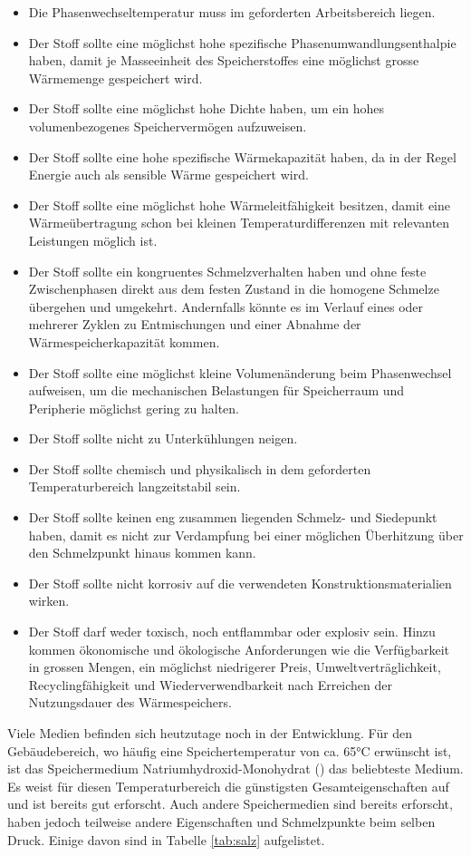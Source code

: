 \documentclass[11pt,a4paper]{scrartcl}
\begin{document}
\begin{itemize}
  \item Die Phasenwechseltemperatur muss im geforderten Arbeitsbereich liegen.
 \item Der Stoff sollte eine möglichst hohe spezifische
  Phasenumwandlungsenthalpie haben, damit je Masseeinheit des Speicherstoffes eine möglichst grosse
Wärmemenge gespeichert wird.
\item Der Stoff sollte eine möglichst hohe Dichte haben, um ein hohes
volumenbezogenes Speichervermögen aufzuweisen.
\item Der Stoff sollte eine hohe spezifische Wärmekapazität haben, da in der Regel
Energie auch als sensible Wärme gespeichert wird.
\item Der Stoff sollte eine möglichst hohe Wärmeleitfähigkeit besitzen, damit eine
Wärmeübertragung schon bei kleinen Temperaturdifferenzen mit relevanten
Leistungen möglich ist.
\item Der Stoff sollte ein kongruentes Schmelzverhalten haben und ohne feste
Zwischenphasen direkt aus dem festen Zustand in die homogene Schmelze übergehen
und umgekehrt. Andernfalls könnte es im Verlauf eines oder mehrerer Zyklen zu
Entmischungen und einer Abnahme der Wärmespeicherkapazität kommen.
\item Der Stoff sollte eine möglichst kleine Volumenänderung beim Phasenwechsel
aufweisen, um die mechanischen Belastungen für Speicherraum und Peripherie
möglichst gering zu halten.
\item Der Stoff sollte nicht zu Unterkühlungen neigen.
\item Der Stoff sollte chemisch und physikalisch in dem geforderten
Temperaturbereich langzeitstabil sein.
\item Der Stoff sollte keinen eng zusammen liegenden Schmelz- und Siedepunkt haben,
damit es nicht zur Verdampfung bei einer möglichen Überhitzung über den
Schmelzpunkt hinaus kommen kann.
\item Der Stoff sollte nicht korrosiv auf die verwendeten Konstruktionsmaterialien
wirken.
\item  Der Stoff darf weder toxisch, noch entflammbar oder explosiv sein. Hinzu
kommen ökonomische und ökologische Anforderungen wie die Verfügbarkeit in
grossen Mengen, ein möglichst niedrigerer Preis, Umweltverträglichkeit,
Recyclingfähigkeit und Wiederverwendbarkeit nach Erreichen der Nutzungsdauer des
Wärmespeichers.
\end{itemize}
Viele Medien befinden sich heutzutage noch in der Entwicklung. Für den
Gebäudebereich, wo häufig eine Speichertemperatur von ca. 65°C erwünscht ist,
ist das Speichermedium Natriumhydroxid-Monohydrat () das
beliebteste Medium. Es weist für diesen Temperaturbereich die günstigsten
Gesamteigenschaften auf und ist bereits gut erforscht. Auch andere
Speichermedien sind bereits erforscht, haben jedoch teilweise andere
Eigenschaften und Schmelzpunkte beim selben Druck. Einige davon sind in Tabelle
\ref{tab:salz} aufgelistet.
\end{document}
